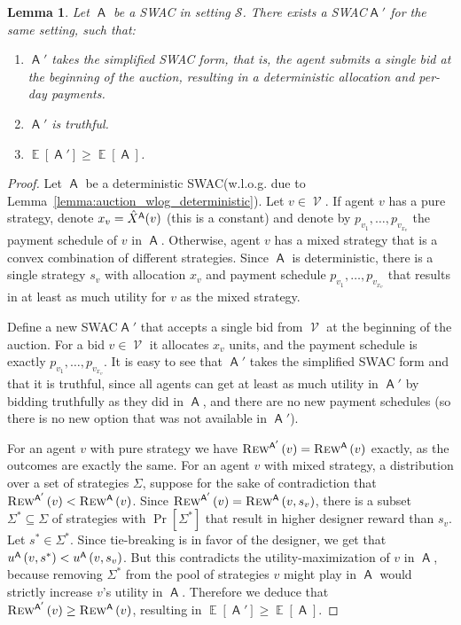 \documentclass[11pt,letterpaper]{article}
\newcommand{\sqbr}[1]{\left[ #1 \right]}
\newcommand{\swac}{SWAC\xspace}
\DeclareMathOperator*{\E}{\bb{E}}
\newcommand{\bb}[1]{\mathbb{#1}}
\DeclareMathOperator{\A}{\auc{A}}
\renewcommand{\S}{\mathcal{S}}
\DeclareMathOperator{\V}{\mathcal{V}}
\theoremstyle{plain}
\newtheorem{lemma}[theorem]{Lemma}
\newcommand{\auc}[1]{\mathsf{#1}}
\begin{document}
\begin{lemma}\label{lemma:simplifications-wlog}
    Let $\A$ be a \swac in setting $\S$. There exists a \swac $\A'$ for the same setting, such that:
    \begin{enumerate}
        \item $\A'$ takes the simplified \swac form, that is, the agent submits a single bid at the beginning of the auction, resulting in a deterministic allocation and per-day payments.
        \item $\A'$ is truthful.
        \item $\E\sqbr{\A'}\geq\E\sqbr{\A}$.
    \end{enumerate}
\end{lemma}
\begin{proof}
    Let $\A$ be a deterministic \swac (w.l.o.g. due to Lemma~\ref{lemma:auction_wlog_deterministic}).
    Let $v\in\V$. If agent $v$ has a pure strategy, denote 
    $x_v=\xhat[\A]{v}$ (this is a constant) and 
    denote by $p_{v_1},\dots,p_{v_{x_v}}$ the payment schedule of $v$ in $\A$. Otherwise, agent $v$ has a mixed strategy that is a convex combination of different strategies. Since $\A$ is deterministic, there is a single strategy $s_v$ with allocation $x_v$ and payment schedule $p_{v_1},\dots,p_{v_{x_v}}$ that results in at least as much utility for $v$ as the mixed strategy.

    Define a new \swac $\A'$ that accepts a single bid from $\V$ at the beginning of the auction. For a bid $v\in\V$ it allocates $x_v$ units, and the payment schedule is exactly $p_{v_1},\dots,p_{v_{x_v}}$. It is easy to see that $\A'$ takes the simplified \swac form and that it is truthful, since all agents can get at least as much utility in $\A'$ by bidding truthfully as they did in $\A$, and there are no new payment schedules (so there is no new option that was not available in $\A'$).

    For an agent $v$ with pure strategy we have $\trew[\A']{v}=\trew[\A]{v}$ exactly, as the outcomes are exactly the same. For an agent $v$ with mixed strategy, a distribution over a set of strategies $\Sigma$, suppose for the sake of contradiction that $\trew[\A']{v}<\trew[\A]{v}$. Since $\trew[\A']{v}=\rew[\A]{v}{s_v}$, there is a subset $\Sigma^\ast\subseteq\Sigma$ of strategies with $\Pr\sqbr{\Sigma^\ast}$ that result in higher designer reward than $s_v$. Let $s^\ast\in\Sigma^\ast$.
    Since tie-breaking is in favor of the designer, we get that $\util[\A]{v}{s^\ast}<\util[\A]{v}{s_v}$. But this contradicts the utility-maximization of $v$ in $\A$, because removing $\Sigma^\ast$ from the pool of strategies $v$ might play in $\A$ would strictly increase $v$'s utility in $\A$. Therefore we deduce that $\trew[\A']{v}\geq\trew[\A]{v}$, resulting in $\E\sqbr{\A'}\geq\E\sqbr{\A}$.
\end{proof}
\end{document}
